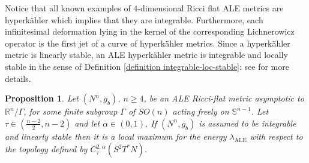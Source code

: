 \documentclass[a4paper,11pt,reqno]{amsart}
\newtheorem{prop}[defn]{Proposition}
\def\RR{\mathbb{R}}
\numberwithin{equation}{section}
\begin{document}
	Notice that all known examples of $4$-dimensional Ricci flat ALE metrics are hyperk\"ahler which implies that they are integrable. Furthermore, each infinitesimal deformation lying in the kernel of the corresponding Lichnerowicz operator is the first jet of a curve of hyperk\"ahler metrics. Since a hyperk\"ahler metric is linearly stable, an ALE hyperk\"ahler metric is integrable and locally stable in the sense of Definition \ref{definition integrable-loc-stable}: see \cite[Section $11$, Chapter $12$]{Besse} for more details.

		
	\begin{prop}\label{local maximum stable integrable}
		Let $(N^n,g_b)$, $n\geq 4$, be an ALE Ricci-flat metric asymptotic to $\RR^n\slash\Gamma$, for some finite subgroup $\Gamma$ of $SO(n)$ acting freely on $\mathbb{S}^{n-1}$. Let $\tau\in\left(\frac{n-2}{2},n-2\right)$ and let $\alpha\in(0,1)$. If $(N^n,g_b)$ is assumed to be integrable and linearly stable then it is a local maximum for the energy $\lambda_{\operatorname{ALE}}$ with respect to the topology defined by $C^{2,\alpha}_{\tau}(S^2T^*N)$. 
	\end{prop}
	
\end{document}
